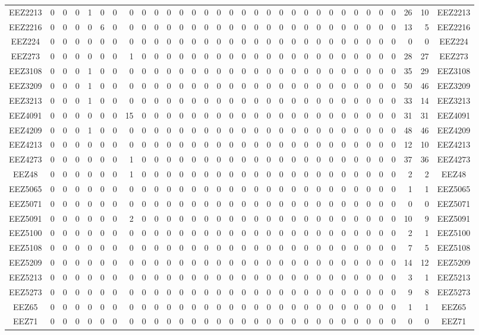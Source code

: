 \documentclass[10pt,a4paper,twoside]{report}
\begin{document}
{\begin{tabular}{crrrrrrrrrrrrrrrrrrrrrrrrrrrrrrc}
EEZ2213&0&0&0&1&0&0&0&0&0&0&0&0&0&0&0&0&0&0&0&0&0&0&0&0&0&0&0&0&26&10&EEZ2213\\
EEZ2216&0&0&0&0&6&0&0&0&0&0&0&0&0&0&0&0&0&0&0&0&0&0&0&0&0&0&0&0&13&5&EEZ2216\\
EEZ224&0&0&0&0&0&0&0&0&0&0&0&0&0&0&0&0&0&0&0&0&0&0&0&0&0&0&0&0&0&0&EEZ224\\
EEZ273&0&0&0&0&0&0&1&0&0&0&0&0&0&0&0&0&0&0&0&0&0&0&0&0&0&0&0&0&28&27&EEZ273\\
EEZ3108&0&0&0&1&0&0&0&0&0&0&0&0&0&0&0&0&0&0&0&0&0&0&0&0&0&0&0&0&35&29&EEZ3108\\
EEZ3209&0&0&0&1&0&0&0&0&0&0&0&0&0&0&0&0&0&0&0&0&0&0&0&0&0&0&0&0&50&46&EEZ3209\\
EEZ3213&0&0&0&1&0&0&0&0&0&0&0&0&0&0&0&0&0&0&0&0&0&0&0&0&0&0&0&0&33&14&EEZ3213\\
EEZ4091&0&0&0&0&0&0&15&0&0&0&0&0&0&0&0&0&0&0&0&0&0&0&0&0&0&0&0&0&31&31&EEZ4091\\
EEZ4209&0&0&0&1&0&0&0&0&0&0&0&0&0&0&0&0&0&0&0&0&0&0&0&0&0&0&0&0&48&46&EEZ4209\\
EEZ4213&0&0&0&0&0&0&0&0&0&0&0&0&0&0&0&0&0&0&0&0&0&0&0&0&0&0&0&0&12&10&EEZ4213\\
EEZ4273&0&0&0&0&0&0&1&0&0&0&0&0&0&0&0&0&0&0&0&0&0&0&0&0&0&0&0&0&37&36&EEZ4273\\
EEZ48&0&0&0&0&0&0&1&0&0&0&0&0&0&0&0&0&0&0&0&0&0&0&0&0&0&0&0&0&2&2&EEZ48\\
EEZ5065&0&0&0&0&0&0&0&0&0&0&0&0&0&0&0&0&0&0&0&0&0&0&0&0&0&0&0&0&1&1&EEZ5065\\
EEZ5071&0&0&0&0&0&0&0&0&0&0&0&0&0&0&0&0&0&0&0&0&0&0&0&0&0&0&0&0&0&0&EEZ5071\\
EEZ5091&0&0&0&0&0&0&2&0&0&0&0&0&0&0&0&0&0&0&0&0&0&0&0&0&0&0&0&0&10&9&EEZ5091\\
EEZ5100&0&0&0&0&0&0&0&0&0&0&0&0&0&0&0&0&0&0&0&0&0&0&0&0&0&0&0&0&2&1&EEZ5100\\
EEZ5108&0&0&0&0&0&0&0&0&0&0&0&0&0&0&0&0&0&0&0&0&0&0&0&0&0&0&0&0&7&5&EEZ5108\\
EEZ5209&0&0&0&0&0&0&0&0&0&0&0&0&0&0&0&0&0&0&0&0&0&0&0&0&0&0&0&0&14&12&EEZ5209\\
EEZ5213&0&0&0&0&0&0&0&0&0&0&0&0&0&0&0&0&0&0&0&0&0&0&0&0&0&0&0&0&3&1&EEZ5213\\
EEZ5273&0&0&0&0&0&0&0&0&0&0&0&0&0&0&0&0&0&0&0&0&0&0&0&0&0&0&0&0&9&8&EEZ5273\\
EEZ65&0&0&0&0&0&0&0&0&0&0&0&0&0&0&0&0&0&0&0&0&0&0&0&0&0&0&0&0&1&1&EEZ65\\
EEZ71&0&0&0&0&0&0&0&0&0&0&0&0&0&0&0&0&0&0&0&0&0&0&0&0&0&0&0&0&0&0&EEZ71\\

\end{tabular}}
\end{document}
